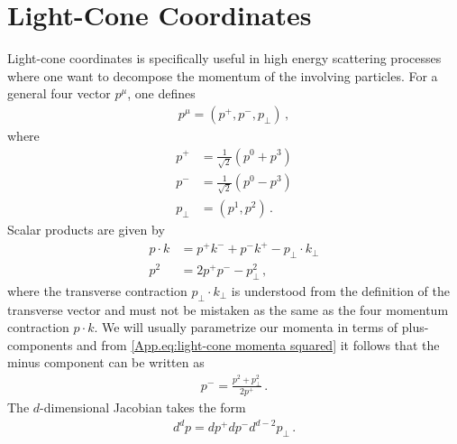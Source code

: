 \section{Light-Cone Coordinates}\label{sec:Appendix Light-cone coordinates}
Light-cone coordinates is specifically useful in high energy scattering processes where one want to decompose the momentum of the involving particles. For a general four vector $p^{\mu}$, one defines
\begin{align}
    p^{\mu}=(p^{+},p^{-},p_{\perp})\,,
\end{align}
where 
\begin{align}
    p^{+}&=\frac{1}{\sqrt{2}}(p^{0}+p^{3})
    \\
    p^{-}&=\frac{1}{\sqrt{2}}(p^{0}-p^{3})
    \\
    p_{\perp}&=(p^1,p^2)\,.
\end{align}
Scalar products are given by
\begin{align}
    p\cdot k&=p^{+}k^{-}+p^{-}k^{+}-p_{\perp}\cdot k_{\perp}
    \\
    p^{2}&=2p^{+}p^{-}-p_{\perp}^{2}\label{App.eq:light-cone momenta squared}\,,
\end{align}
where the transverse contraction $p_{\perp}\cdot k_{\perp}$ is understood from the definition of the transverse vector and must not be mistaken as the same as the four momentum contraction $p\cdot k$.
We will usually parametrize our momenta in terms of plus-components and from \cref{App.eq:light-cone momenta squared} it follows that the minus component can be written as
\begin{align}\label{eq:minus ligh-cone momenta}
    p^{-}=\frac{p^{2}+p_{\perp}^{2}}{2p^{+}}\,.
\end{align}
The $d$-dimensional Jacobian takes the form
\begin{align}
    d^{d}p=dp^{+}dp^{-}d^{d-2}p_{\perp}\,.
\end{align}

